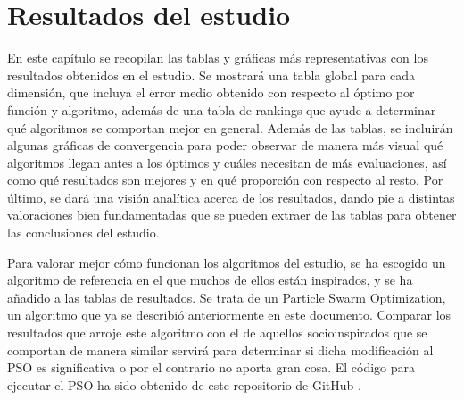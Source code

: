 \chapter{Resultados del estudio}

En este capítulo se recopilan las tablas y gráficas más representativas con los resultados obtenidos en el estudio. Se mostrará una tabla global para cada dimensión, que incluya el error medio obtenido con respecto al óptimo por función y algoritmo, además de una tabla de rankings que ayude a determinar qué algoritmos se comportan mejor en general. Además de las tablas, se incluirán algunas gráficas de convergencia para poder observar de manera más visual qué algoritmos llegan antes a los óptimos y cuáles necesitan de más evaluaciones, así como qué resultados son mejores y en qué proporción con respecto al resto. Por último, se dará una visión analítica acerca de los resultados, dando pie a distintas valoraciones bien fundamentadas que se pueden extraer de las tablas para obtener las conclusiones del estudio.

Para valorar mejor cómo funcionan los algoritmos del estudio, se ha escogido un algoritmo de referencia en el que muchos de ellos están inspirados, y se ha añadido a las tablas de resultados. Se trata de un Particle Swarm Optimization, un algoritmo que ya se describió anteriormente en este documento. Comparar los resultados que arroje este algoritmo con el de aquellos socioinspirados que se comportan de manera similar servirá para determinar si dicha modificación al PSO es significativa o por el contrario no aporta gran cosa. El código para ejecutar el PSO ha sido obtenido de este repositorio de GitHub \cite{pso-github}.

